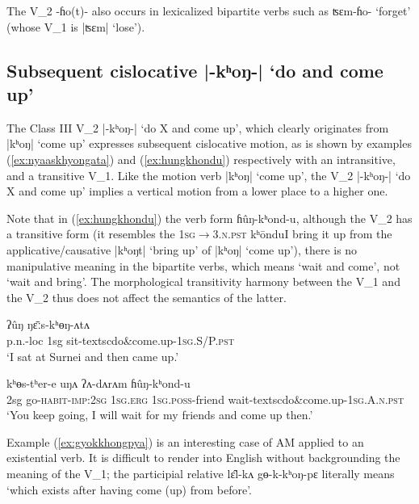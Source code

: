 \documentclass[oneside,a4paper,11pt]{article}
\newcommand{\ipa}[1]{{\phon#1}}
\newcommand{\dhatu}[2]{|\ipa{#1}| `#2'}
\begin{document}
The V_2 \ipa{-ɦo(t)-} also occurs in lexicalized bipartite verbs such as \ipa{ʦɛm-ɦo-} `forget' (whose V_1 is \dhatu{ʦɛm}{lose}).

\subsection{Subsequent cislocative \dhatu{-kʰoŋ-}{do and come up}} \label{sec:v2.khoN}
The Class III V_2 \dhatu{-kʰoŋ-}{do X and come up}, which clearly originates from \dhatu{kʰoŋ}{come up} expresses subsequent cislocative motion, as is shown by examples (\ref{ex:nyaaskhyongata}) and (\ref{ex:hungkhondu}) respectively with an intransitive, and a transitive V_1. Like the motion verb  \dhatu{kʰoŋ}{come up}, the V_2  \dhatu{-kʰoŋ-}{do X and come up} implies a vertical motion from a lower place to a higher one.

Note that in (\ref{ex:hungkhondu}) the verb form \ipa{ɦûŋ-kʰond-u}, although the V_2 has a transitive form (it resembles the \textsc{1sg$\rightarrow$3.n.pst} \ipa{kʰōndu}{I bring it up} from the applicative/causative \dhatu{kʰoŋt}{bring up} of \dhatu{kʰoŋ}{come up}), there is no manipulative meaning in the bipartite verbs, which means `wait and come', not `wait and bring'. The morphological transitivity harmony between the V_1 and the V_2 thus does not affect the semantics of the latter.

\begin{exe}
\ex \label{ex:nyaaskhyongata}
 \gll  \ipa{sʉ̂rnɛj-bi} \ipa{ʔûŋ} \ipa{ŋɛ̄ːs-kʰɵŋ-ʌtʌ} \\
 p.n.-loc 1sg sit-textsc{do\&come.up}-\textsc{1sg.S/P.pst} \\
\glt  `I sat at Surnei and then came up.'
\end{exe}

\begin{exe}  
\ex \label{ex:hungkhondu}
 \gll  \ipa{ʔīn} \ipa{kʰɵs-tʰer-e} \ipa{uŋʌ} \ipa{ʔʌ-dʌrʌm} \ipa{ɦûŋ-kʰond-u} \\
 2sg go-\textsc{habit}-\textsc{imp}:\textsc{2sg} \textsc{1sg}.\textsc{erg} \textsc{1sg}.\textsc{poss}-friend wait-textsc{do\&come.up}-\textsc{1sg.A.n.pst} \\
\glt `You keep going, I will wait for my friends and come up then.'
\end{exe}

Example (\ref{ex:gyokkhongpya}) is an interesting case of AM applied to an existential verb. It is difficult to render into English without backgrounding the meaning of the V_1; the participial relative \ipa{lɛ̂l-kʌ} \ipa{gɵ-k-kʰoŋ-pɛ} literally means `which exists after having come (up) from before'.
\end{document}
